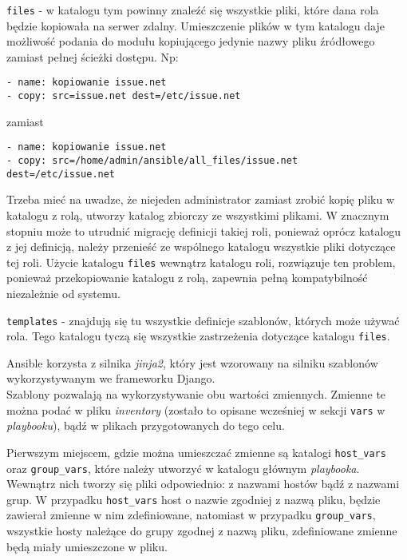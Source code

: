 \begin{description}
	\item{\texttt{files}} - w katalogu tym powinny znaleźć się wszystkie pliki, które dana rola będzie kopiowała na serwer zdalny.
		Umieszczenie plików w tym katalogu daje możliwość podania do modułu kopiującego jedynie nazwy pliku źródłowego zamiast pełnej ścieżki dostępu. Np:
		\begin{lstlisting}
- name: kopiowanie issue.net
- copy: src=issue.net dest=/etc/issue.net
		\end{lstlisting}
		zamiast
		\begin{lstlisting}
- name: kopiowanie issue.net
- copy: src=/home/admin/ansible/all_files/issue.net dest=/etc/issue.net
		\end{lstlisting}
		Trzeba mieć na uwadze, że niejeden administrator zamiast zrobić kopię pliku w katalogu z rolą, utworzy katalog zbiorczy ze wszystkimi plikami.
		W znacznym stopniu może to utrudnić migrację definicji takiej roli, ponieważ oprócz katalogu z jej definicją, należy przenieść ze wspólnego katalogu wszystkie pliki dotyczące tej roli.
		Użycie katalogu \texttt{files} wewnątrz katalogu roli, rozwiązuje ten problem, ponieważ przekopiowanie katalogu z rolą, zapewnia pełną kompatybilność niezależnie od systemu.
	\item{\texttt{templates}} - znajdują się tu wszystkie definicje szablonów, których może używać rola.
		Tego katalogu tyczą się wszystkie zastrzeżenia dotyczące katalogu \texttt{files}.

		Ansible korzysta z silnika \textit{jinja2}, który jest wzorowany na silniku szablonów wykorzystywanym we frameworku Django.\\
		Szablony pozwalają na wykorzystywanie obu wartości zmiennych.
		Zmienne te można podać w pliku \textit{inventory} (zostało to opisane wcześniej w sekcji \texttt{vars} w \textit{playbooku}), bądź w plikach przygotowanych do tego celu.
		
		Pierwszym miejscem, gdzie można umieszczać zmienne są katalogi \texttt{host\_vars} oraz \texttt{group\_vars}, które należy utworzyć w katalogu głównym \textit{playbooka}.
		Wewnątrz nich tworzy się pliki odpowiednio: z nazwami hostów bądź z nazwami grup.
W przypadku \texttt{host\_vars} host o nazwie zgodniej z nazwą pliku, będzie zawierał zmienne w nim zdefiniowane, natomiast w przypadku \texttt{group\_vars}, wszystkie hosty należące do grupy zgodnej z nazwą pliku, zdefiniowane zmienne będą miały umieszczone w pliku.


\end{description}
